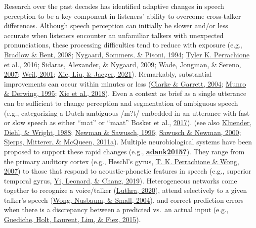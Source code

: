 \documentclass[
  11pt,
  english,
  man,floatsintext]{apa6}
\begin{document}
Research over the past decades has identified adaptive changes in speech perception to be a key component in listeners' ability to overcome cross-talker differences. Although speech perception can initially be slower and/or less accurate when listeners encounter an unfamiliar talkers with unexpected pronunciations, these processing difficulties tend to reduce with exposure (e.g., \protect\hyperlink{ref-bradlow-bent2008}{Bradlow \& Bent, 2008}; \protect\hyperlink{ref-nygaard1994}{Nygaard, Sommers, \& Pisoni, 1994}; \protect\hyperlink{ref-Perrachione2016}{Tyler K. Perrachione et al., 2016}; \protect\hyperlink{ref-sidaras2009}{Sidaras, Alexander, \& Nygaard, 2009}; \protect\hyperlink{ref-wade2007}{Wade, Jongman, \& Sereno, 2007}; \protect\hyperlink{ref-weil2001a}{Weil, 2001}; \protect\hyperlink{ref-xie2021jep}{Xie, Liu, \& Jaeger, 2021}). Remarkably, substantial improvements can occur within minutes or less (\protect\hyperlink{ref-clarke-garrett2004}{Clarke \& Garrett, 2004}; \protect\hyperlink{ref-munro-derwing1995}{Munro \& Derwing, 1995}; \protect\hyperlink{ref-xie2018jasa}{Xie et al., 2018}). Even a context as brief as a single utterance can be sufficient to change perception and segmentation of ambiguous speech (e.g., categorizing a Dutch ambiguous /m?t/ embedded in an utterance with fast or slow speech as either {``mat''} or {``maat''} Bosker et al., \protect\hyperlink{ref-bosker2017}{2017}). (see also \protect\hyperlink{ref-kluender1988}{Kluender, Diehl, \& Wright, 1988}; \protect\hyperlink{ref-newman-sawusch1996}{Newman \& Sawusch, 1996}; \protect\hyperlink{ref-sawusch-newman2000}{Sawusch \& Newman, 2000}; \protect\hyperlink{ref-sjerps2011}{Sjerps, Mitterer, \& McQueen, 2011a}). Multiple neurobiological systems have been proposed to support these rapid changes (e.g., \protect\hyperlink{ref-adank2015}{\textbf{adank2015?}}). They range from the primary auditory cortex (e.g., Heschl's gyrus, \protect\hyperlink{ref-Perrachione2007}{T. K. Perrachione \& Wong, 2007}) to those that respond to acoustic-phonetic features in speech (e.g., superior temporal gyrus, \protect\hyperlink{ref-Yi2019}{Yi, Leonard, \& Chang, 2019}). Heterogeneous networks come together to recognize a voice/talker (\protect\hyperlink{ref-luthra2020b}{Luthra, 2020}), attend selectively to a given talker's speech (\protect\hyperlink{ref-wong2004}{Wong, Nusbaum, \& Small, 2004}), and correct prediction errors when there is a discrepancy between a predicted vs.~an actual input (e.g., \protect\hyperlink{ref-guediche2015evidence}{Guediche, Holt, Laurent, Lim, \& Fiez, 2015}).
\end{document}
